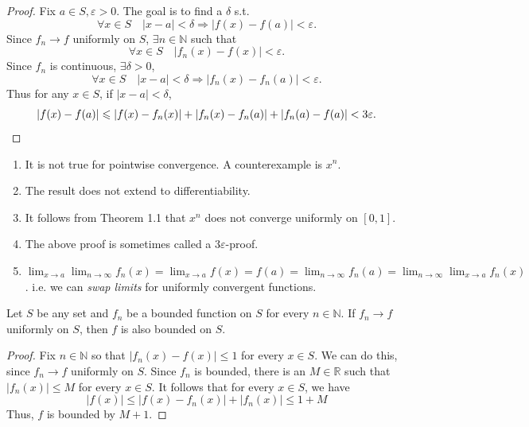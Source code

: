 \documentclass[a4paper]{article}
\renewcommand{\epsilon}{\varepsilon}
\begin{document}
\begin{proof}
    Fix $ a\in S, \epsilon>0 $. The goal is to find a $ \delta $ s.t. 
    \[
        \forall x\in S\quad |x-a|<\delta \Longrightarrow |f(x)-f(a)|<\epsilon.
    \]
    Since $ f_n\to f $ uniformly on $S$, $ \exists n\in \mathbb{N} $ such that 
    \[
        \forall x\in S\quad |f_n(x)-f(x)|<\epsilon.
    \]
    Since $f_n$ is continuous, $ \exists \delta>0 $, 
    \[
        \forall x\in S\quad |x-a|<\delta \Longrightarrow |f_n(x)-f_n(a)|<\epsilon.
    \]
    Thus for any $x\in S$, if $ |x-a|<\delta $,
    \[
        |f(x)-f(a)|\le |f(x)-f_n(x)|+|f_n(x)-f_n(a)|+|f_n(a)-f(a)|<3\epsilon.\qedhere
    \]
\end{proof}
\begin{remark}
    \begin{enumerate}
        \item It is not true for pointwise convergence. A counterexample is $x^n$.
        \item The result does not extend to differentiability.
        \item It follows from Theorem 1.1 that $x^{n}$ does not converge uniformly on $[0,1]$.
        \item The above proof is sometimes called a $3 \varepsilon$-proof.
        \item $\displaystyle \lim _{x \rightarrow a} \lim _{n \rightarrow \infty} f_{n}(x)=\lim _{x \rightarrow a} f(x)=f(a)=\lim _{n \rightarrow \infty} f_{n}(a)=\lim _{n \rightarrow \infty} \lim _{x \rightarrow a} f_{n}(x)$. i.e. we can \textit{swap limits} for uniformly convergent functions.
    \end{enumerate}
\end{remark}
\begin{lemma}\label{lemma 2}
    Let $S$ be any set and $f_{n}$ be a bounded function on $S$ for every $n \in \mathbb{N}$. If $f_{n} \rightarrow f$ uniformly on $S$, then $f$ is also bounded on $S$.
\end{lemma}
\begin{proof}
    Fix $n \in \mathbb{N}$ so that $\left|f_{n}(x)-f(x)\right| \leqslant 1$ for every $x \in S$. We can do this, since $f_{n} \rightarrow f$ uniformly on $S$. Since $f_{n}$ is bounded, there is an $M \in \mathbb{R}$ such that $\left|f_{n}(x)\right| \leqslant M$ for every $x \in S$. It follows that for every $x \in S$, we have
    \[
    |f(x)| \leqslant\left|f(x)-f_{n}(x)\right|+\left|f_{n}(x)\right| \leqslant 1+M
    \]
    Thus, $f$ is bounded by $M+1$.
\end{proof}
\end{document}
